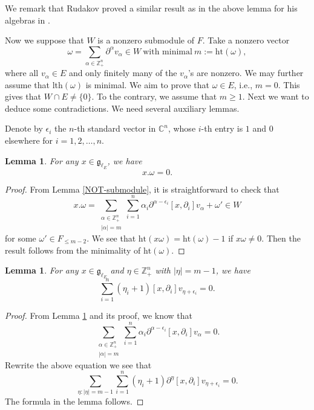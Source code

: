\documentclass[12pt, a4paper]{amsart}
\newcommand{\C}{\mathbb{C}}
\newcommand{\Z}{\mathbb Z}
\theoremstyle{Theorem}
\theoremstyle{Theorem}
\newtheorem{lemma}[thm]{Lemma}
\numberwithin{equation}{section}
\begin{document}
We remark that Rudakov    proved a similar result as in the above lemma   for his algebras in \cite{R}. 

Now we suppose that $W$ is a nonzero   submodule of $F$. Take a nonzero vector
\begin{equation}\label{omega}
\omega=\sum_{\alpha\in\Z_{+}^{n}}\partial^{\alpha}v_{\alpha}\in W\ \text{with minimal}\ m:=\mathrm{ht}(\omega),\end{equation}
where all $v_{\alpha}\in E$ and only finitely many of the $v_{\alpha}$'s are nonzero.
We may further assume that lth$(\omega)$ is minimal. We aim to prove that $\omega\in{E}$, i.e., $m=0$.
This gives that $W\cap E\neq\{0\}$. To the contrary, we assume that $m\geq1$.
Next we want to deduce some contradictions. We need several auxiliary lemmas.

Denote by $\epsilon_{i}$ the $n$-th standard vector in $\C^n$, whose $i$-th entry is $1$ and $0$ elsewhere for $i=1,2,\dots,n$.

\begin{lemma}\label{minimality-height-vector}
For any $x\in\mathfrak{g}_{\ell_E}$, we have
\[x.\omega = 0.\]
\end{lemma}

\begin{proof}
From Lemma \ref{NOT-submodule}, it is straightforward to check that
\[x.\omega=\sum_{\substack{\alpha\in\mathbb{Z}_+^n\\|\alpha|=m}}\sum_{i=1}^{n}
\alpha_i\partial^{\alpha-\epsilon_i}[x,\partial_i]v_{\alpha}+\omega'
\in W\]
	for some $\omega'\in F_{\leq m-2}$. We see that $\text{ht}(x\omega)=\text{ht}(\omega)-1$ if $x\omega\ne0$.
	Then the result follows from the minimality of $\text{ht}(\omega)$.
\end{proof}
\begin{lemma}\label{A-useful-equation}
For any $x\in\mathfrak{g}_{\ell_E}$ and $\eta\in\mathbb{Z}_+^n$ with $|\eta|=m-1$, we have
\begin{equation*}
\sum_{i=1}^n(\eta_i+1)[x,\partial_i]v_{\eta+\epsilon_i}=0.
\end{equation*}
\end{lemma}

\begin{proof}
	From Lemma \ref{minimality-height-vector} and its proof, we know  that
	\[ \sum_{\substack{\alpha\in\mathbb{Z}_+^n\\|\alpha|=m}}\sum_{i=1}^{n}
	\alpha_i\partial^{\alpha-\epsilon_i}[x,\partial_i]v_{\alpha}=0.\]
Rewrite the above equation we see that 
$$
\sum_{\eta:|\eta|=m-1}\sum_{i=1}^n(\eta_i+1)\partial^\eta[x,\partial_i]v_{\eta+\epsilon_i}=0.
$$ The formula in the lemma follows.
\end{proof}
\end{document}

